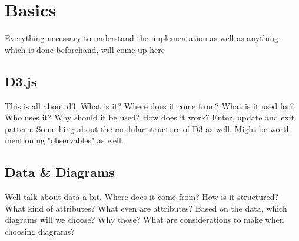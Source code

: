 \chapter{Basics}
Everything necessary to understand the implementation as well as anything which is done beforehand, will come up here

\section{D3.js}
This is all about d3. What is it? Where does it come from? What is it used for? Who uses it? Why should it be used? How does it work? Enter, update and exit pattern. Something about the modular structure of D3 as well. Might be worth mentioning "observables" as well.

\section{Data \& Diagrams}
Well talk about data a bit. Where does it come from? How is it structured? What kind of attributes? What even are attributes? Based on the data, which diagrams will we choose? Why those? What are considerations to make when choosing diagrams?
